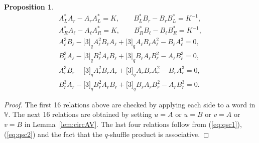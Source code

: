\documentclass[11pt]{article}
\numberwithin{equation}{section}
\numberwithin{equation}{section}
\newtheorem{Proposition}[Theorem]{Proposition}
 { \theoremstyle{definition}
\newtheorem{Definition}[Theorem]{Definition}
\newtheorem{Example}[Theorem]{Example}
\newtheorem{Note}[Theorem]{Note}
}
\begin{document}
{\begin{Proposition}
\begin{gather*}
A^*_L A_r - A_r A^*_L = K,\qquad B^*_L B_r - B_r B^*_L = K^{-1},\\
A^*_R A_\ell - A_\ell A^*_R = K,\qquad B^*_R B_\ell - B_\ell B^*_R = K^{-1},\\
A_\ell^3 B_\ell- \lbrack 3 \rbrack_q A_\ell^2 B_\ell A_\ell+
\lbrack 3 \rbrack_q A_\ell B_\ell A^2_\ell-B_\ell A^3_\ell = 0,\\
B_\ell^3 A_\ell-\lbrack 3 \rbrack_q B_\ell^2 A_\ell B_\ell+
\lbrack 3 \rbrack_q B_\ell A_\ell B^2_\ell-A_\ell B^3_\ell = 0,\\
A_r^3 B_r-\lbrack 3 \rbrack_q A_r^2 B_r A_r+\lbrack 3 \rbrack_q A_r B_r A^2_r-B_r A^3_r = 0,\\
B_r^3 A_r-\lbrack 3 \rbrack_q B_r^2 A_r B_r+\lbrack 3 \rbrack_q B_r A_r B^2_r-A_r B^3_r = 0.
\end{gather*}
\end{Proposition}
\begin{proof}The first 16 relations above are checked by applying each side to a word in $\mathbb V$. The next 16 relations are obtained by setting $u=A$ or $u=B$ or $v=A$ or $v=B$ in Lemma~\ref{lem:circAV}. The last four relations follow from (\ref{eq:qsc1}), (\ref{eq:qsc2}) and the fact that the $q$-shuffle product
is associative.
\end{proof}

}
\end{document}
